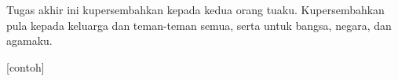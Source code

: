 \vspace{7cm}

\begin{center}
	Tugas akhir ini kupersembahkan kepada kedua orang tuaku. Kupersembahkan pula kepada keluarga dan teman-teman semua, serta untuk bangsa, negara, dan agamaku.
	
	[contoh]
\end{center}

